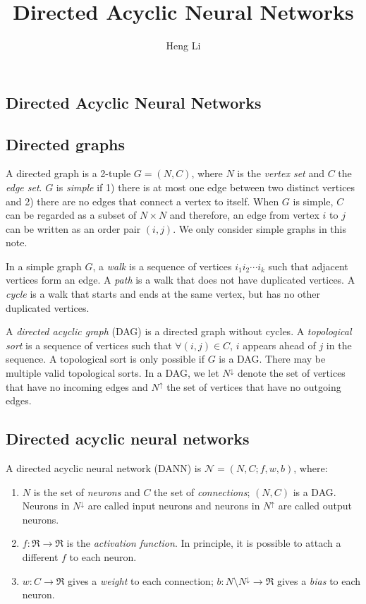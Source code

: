 \documentclass{bioinfo}
\begin{document}

\title[DANN]{Directed Acyclic Neural Networks}
\author[Li]{Heng Li}
\address{Broad Institute, 75 Ames Street, Cambridge, MA 02142, USA}
\maketitle

\begin{methods}

\section{Directed Acyclic Neural Networks}

\subsection{Directed graphs}

A directed graph is a 2-tuple $G=(N,C)$, where $N$ is the \emph{vertex set} and
$C$ the \emph{edge set}. $G$ is \emph{simple} if 1) there is at most one edge
between two distinct vertices and 2) there are no edges that connect a vertex
to itself. When $G$ is simple, $C$ can be regarded as a subset of $N\times N$
and therefore, an edge from vertex $i$ to $j$ can be written as an order pair
$(i,j)$. We only consider simple graphs in this note.

In a simple graph $G$, a \emph{walk} is a sequence of vertices $i_1i_2\cdots
i_k$ such that adjacent vertices form an edge. A \emph{path} is a walk that
does not have duplicated vertices. A \emph{cycle} is a walk that starts and
ends at the same vertex, but has no other duplicated vertices.

A \emph{directed acyclic graph} (DAG) is a directed graph without cycles.
A \emph{topological sort} is a sequence of vertices such that $\forall(i,j)\in
C$, $i$ appears ahead of $j$ in the sequence. A topological sort is only
possible if $G$ is a DAG. There may be multiple valid topological sorts.
In a DAG, we let $N^{\downarrow}$ denote the set of vertices that have no incoming edges
and $N^{\uparrow}$ the set of vertices that have no outgoing edges.

\subsection{Directed acyclic neural networks}

A directed acyclic neural network (DANN) is $\mathcal{N}=(N,C;f,w,b)$, where:
\begin{enumerate}
\item $N$ is the set of \emph{neurons} and $C$ the set of \emph{connections};
	$(N,C)$ is a DAG. Neurons in $N^{\downarrow}$ are called input neurons
	and neurons in $N^{\uparrow}$ are called output neurons.
\item $f:\Re\to\Re$ is the \emph{activation function}. In principle, it is
	possible to attach a different $f$ to each neuron.
\item $w:C\to\Re$ gives a \emph{weight} to each connection; $b:N\setminus
	N^{\downarrow}\to\Re$ gives a \emph{bias} to each neuron.
\end{enumerate}


\end{methods}
\end{document}
